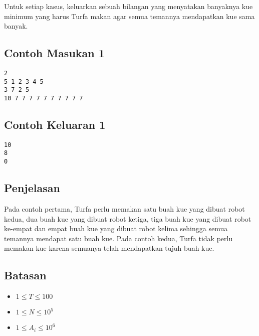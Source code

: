 \documentclass{article}
\begin{document}
\par Untuk setiap kasus, keluarkan sebuah bilangan yang menyatakan banyaknya kue minimum yang harus Turfa makan agar semua temannya mendapatkan kue sama banyak.

\subsection*{Contoh Masukan 1}

\begin{lstlisting}
2
5 1 2 3 4 5
3 7 2 5
10 7 7 7 7 7 7 7 7 7 7
\end{lstlisting}

\subsection*{Contoh Keluaran 1}

\begin{lstlisting}
10
8
0
\end{lstlisting}

\subsection*{Penjelasan}

Pada contoh pertama, Turfa perlu memakan satu buah kue yang dibuat robot kedua, dua buah kue yang dibuat robot ketiga, tiga buah kue yang dibuat robot ke-empat dan empat buah kue yang dibuat robot kelima sehingga semua temannya mendapat satu buah kue.
Pada contoh kedua, Turfa tidak perlu memakan kue karena semuanya telah mendapatkan tujuh buah kue.

\subsection*{Batasan}

\begin{itemize}
	\item $1 \leq T \leq 100$
	\item $1 \leq N \leq 10^5$
	\item $1 \leq A_i \leq 10^6$
\end{itemize}
\end{document}

